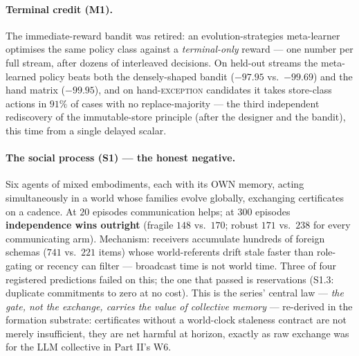 \documentclass{article}
\begin{document}
\paragraph{Terminal credit (M1).} The immediate-reward bandit was
retired: an evolution-strategies meta-learner optimises the same
policy class against a \emph{terminal-only} reward --- one number per
full stream, after dozens of interleaved decisions. On held-out
streams the meta-learned policy beats both the densely-shaped bandit
($-97.95$ vs.\ $-99.69$) and the hand matrix ($-99.95$), and on
hand-\textsc{exception} candidates it takes store-class actions in
$91\%$ of cases with no replace-majority --- the third independent
rediscovery of the immutable-store principle (after the designer and
the bandit), this time from a single delayed scalar.

\paragraph{The social process (S1) --- the honest negative.} Six
agents of mixed embodiments, each with its OWN memory, acting
simultaneously in a world whose families evolve globally, exchanging
certificates on a cadence. At $20$ episodes communication helps; at
$300$ episodes \textbf{independence wins outright} (fragile $148$
vs.\ $170$; robust $171$ vs.\ $238$ for every communicating arm).
Mechanism: receivers accumulate hundreds of foreign schemas ($741$
vs.\ $221$ items) whose world-referents drift stale faster than
role-gating or recency can filter --- broadcast time is not world
time. Three of four registered predictions failed on this; the one
that passed is reservations (S1.3: duplicate commitments to zero at
no cost). This is the series' central law --- \emph{the gate, not the
exchange, carries the value of collective memory} --- re-derived in
the formation substrate: certificates without a world-clock
staleness contract are not merely insufficient, they are net harmful
at horizon, exactly as raw exchange was for the LLM collective in
Part II's W6.
\end{document}
